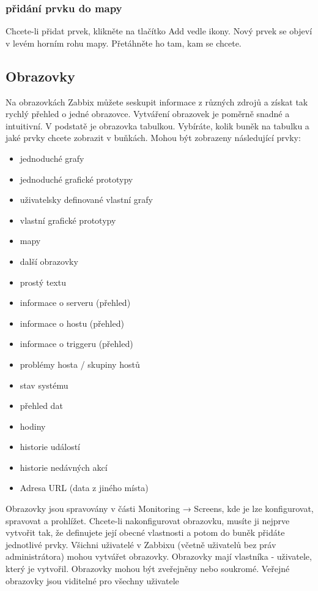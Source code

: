 \documentclass{article}
\begin{document}
\subsubsection{přidání prvku do mapy}
      Chcete-li přidat prvek, klikněte na tlačítko Add vedle ikony. Nový prvek se objeví v levém horním rohu mapy. Přetáhněte ho tam, kam se chcete.
\subsection{Obrazovky}
Na obrazovkách Zabbix můžete seskupit informace z různých zdrojů a získat tak rychlý přehled o jedné obrazovce. Vytváření obrazovek je poměrně snadné a intuitivní.\newline
V podstatě je obrazovka tabulkou. Vybíráte, kolik buněk na tabulku a jaké prvky chcete zobrazit v buňkách. Mohou být zobrazeny následující prvky:
\begin{itemize}
    \item jednoduché grafy
    \item jednoduché grafické prototypy
    \item uživatelsky definované vlastní grafy
    \item vlastní grafické prototypy
    \item mapy
    \item další obrazovky
    \item prostý textu
    \item informace o serveru (přehled)
    \item informace o hostu (přehled)
    \item informace o triggeru (přehled)
    \item problémy hosta / skupiny hostů
    \item stav systému
    \item přehled dat
    \item hodiny
    \item historie událostí
    \item historie nedávných akcí
    \item Adresa URL (data z jiného místa)
\end{itemize}
Obrazovky jsou spravovány v části Monitoring → Screens, kde je lze konfigurovat, spravovat a prohlížet. \newline
Chcete-li nakonfigurovat obrazovku, musíte ji nejprve vytvořit tak, že definujete její obecné vlastnosti a potom do buněk přidáte jednotlivé prvky.\newline
Všichni uživatelé v Zabbixu (včetně uživatelů bez práv administrátora) mohou vytvářet obrazovky. Obrazovky mají vlastníka - uživatele, který je vytvořil.\newline
Obrazovky mohou být zveřejněny nebo soukromé. Veřejné obrazovky jsou viditelné pro všechny uživatele\newline
\end{document}
